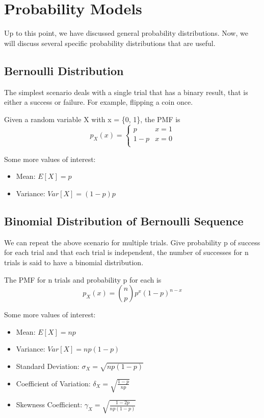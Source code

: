 \chapter{Probability Models}
Up to this point, we have discussed general probability distributions. Now, we will discuss several specific probability distributions that are useful.

\section*{Bernoulli Distribution} 
The simplest scenario deals with a single trial that has a binary result, that is either a success or failure. For example, flipping a coin once.

Given a random variable X with x = \{0, 1\}, the PMF is 
\[
    p_X(x) = \begin{cases}
        p & x = 1 \\
        1 - p & x = 0 \\
    \end{cases}
\]

Some more values of interest:
\begin{itemize}
    \item Mean: $E[X] = p$
    \item Variance: $Var[X] = (1-p)p$
\end{itemize}

\section*{Binomial Distribution of Bernoulli Sequence} 
We can repeat the above scenario for multiple trials. Give probability p of success for each trial and that each trial is independent, the number of successes for n trials is said to have a binomial distribution.

The PMF for n trials and probability p for each is 
\[
    p_X(x) = {n \choose p} p^x (1 - p)^{n-x}
\]

Some more values of interest:
\begin{itemize}
    \item Mean: $E[X] = np$
    \item Variance: $Var[X] = np(1-p)$
    \item Standard Deviation: $\sigma_X = \sqrt{np(1-p)}$ 
    \item Coefficient of Variation: $\delta_X = \sqrt{\frac{1-p}{np}}$
    \item Skewness Coefficient: $\gamma_X = \sqrt{\frac{1-2p}{np(1-p)}}$ 
\end{itemize}

